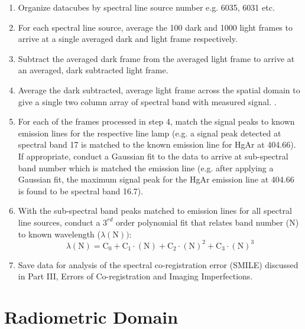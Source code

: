 \documentclass[nohyper,nobib]{tufte-book}
\begin{document}
\begin{enumerate}
	\item Organize datacubes by spectral line source number e.g. 6035, 6031 etc. 
	\item For each spectral line source, average the 100 dark and 1000 light frames to arrive at a single averaged dark and light frame respectively. 
	\item Subtract the averaged dark frame from the averaged light frame to arrive at an averaged, dark subtracted light frame. 
	\item Average the dark subtracted, average light frame across the spatial domain to give a single two column array of spectral band with measured signal.  . 
	\item For each of the frames processed in step 4, match the signal peaks to known emission lines for the respective line lamp (e.g. a signal peak detected at spectral band 17 is matched to the known emission line for HgAr at 404.66). If appropriate, conduct a Gaussian fit to the data to arrive at sub-spectral band number which is matched the emission line (e.g. after applying a Gaussian fit, the maximum signal peak for the HgAr emission line at 404.66 is found to be spectral band 16.7). 
	\item With the sub-spectral band peaks matched to emission lines for all spectral line sources, conduct a $3^{rd}$ order polynomial fit that relates band number ($\mathrm{N}$) to known wavelength ($\lambda(\mathrm{N}))$:
	\begin{equation}
		\lambda(\mathrm{N})=\mathrm{C_{0}}+\mathrm{C_{1}} \cdot(\mathrm{N})+\mathrm{C_{2}} \cdot(\mathrm{N})^2+\mathrm{C_{3}}\cdot(\mathrm{N})^3
	\end{equation}
	\item Save data for analysis of the spectral co-registration error (SMILE) discussed in Part III, Errors of Co-registration and Imaging Imperfections.  
\end{enumerate}
 

\part{Radiometric Domain}
\end{document}
